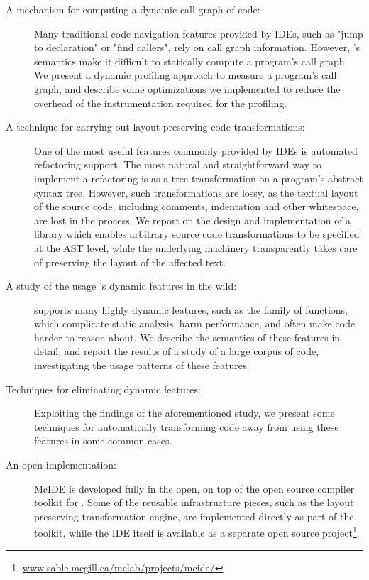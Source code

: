 \begin{description}

\item[A mechanism for computing a dynamic call graph of \matlab code:] Many
traditional code navigation features provided by IDEs, such as "jump to
declaration" or "find callers", rely on call graph information. However,
\matlab's semantics make it difficult to statically compute a program's call
graph. We present a dynamic profiling approach to measure a \matlab program's
call graph, and describe some optimizations we implemented to reduce the
overhead of the instrumentation required for the profiling.

\item[A technique for carrying out layout preserving code transformations:] One
of the most useful features commonly provided by IDEs is automated refactoring
support. The most natural and straightforward way to implement a refactoring is
as a tree transformation on a program's abstract syntax tree. However, such
transformations are lossy, as the textual layout of the source code, including
comments, indentation and other whitespace, are lost in the process. We report
on the design and implementation of a library which enables arbitrary source
code transformations to be specified at the AST level, while the underlying
machinery transparently takes care of preserving the layout of the affected
text.

\item[A study of the usage \matlab's dynamic features in the wild:] \matlab
supports many highly dynamic features, such as the  family of
functions, which complicate static analysis, harm performance, and often make
code harder to reason about. We describe the semantics of these features in
detail, and report the results of a study of a large corpus of \matlab code,
investigating the usage patterns of these features.

\item[Techniques for eliminating dynamic features:] Exploiting the findings of
the aforementioned study, we present some techniques for automatically
transforming code away from using these features in some common cases.

\item[An open implementation:] McIDE is developed fully in the open, on top of
  the open source \mclab compiler toolkit for \matlab. Some of the reusable
  infrastructure pieces, such as the layout preserving transformation engine,
  are implemented directly as part of the toolkit, while the IDE itself is
  available as a separate open source
  project\footnote{\url{www.sable.mcgill.ca/mclab/projects/mcide/}}.

\end{description}

